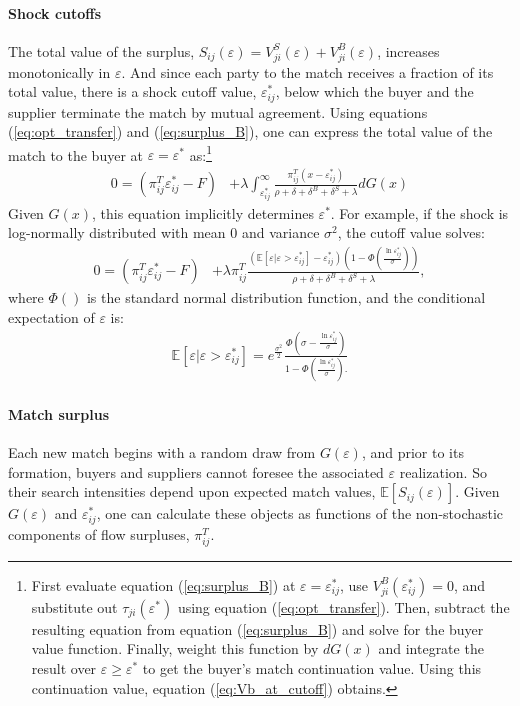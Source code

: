 \documentclass[12pt]{article} \usepackage{amsmath,amssymb,amsthm,geometry,graphicx,setspace,algorithm,algpseudocode,float}
\newcommand{\subsubsubsection}[1]{\paragraph{#1}}
\begin{document}
\subsubsubsection{Shock cutoffs}
The total value of the surplus,  $S_{ij}(\varepsilon) =   V_{ji}^S(\varepsilon) + V_{ji}^B(\varepsilon)$, increases monotonically in $\varepsilon$. And since each party to the match receives a fraction of its total value, there is a shock cutoff value, $\varepsilon_{ij}^\ast$, below which the buyer and the supplier terminate the match by mutual agreement. Using equations (\ref{eq:opt_transfer}) and (\ref{eq:surplus_B}), one can express the total value of the match to the buyer at $\varepsilon = \varepsilon^{\ast}$ as:\footnote{First evaluate equation (\ref{eq:surplus_B}) at $\varepsilon = \varepsilon_{ij}^\ast$, use $V_{ji}^B(\varepsilon_{ij}^\ast)=0$, and substitute out $\tau_{ji}(\varepsilon^{\ast})$ using equation (\ref{eq:opt_transfer}). Then, subtract the resulting equation from equation (\ref{eq:surplus_B}) and solve for the buyer value function. Finally, weight this function by $dG(x)$ and integrate the result over $\varepsilon \geq \varepsilon^{\ast}$ to get the buyer's match continuation value. Using this continuation value, equation (\ref{eq:Vb_at_cutoff}) obtains.}
\begin{align}
    0 = (\pi_{ij}^T\varepsilon_{ij}^\ast -F) & +  \lambda \int_{\varepsilon_{ij}^\ast}^{\infty} \frac{\pi_{ij}^T(x - \varepsilon_{ij}^\ast) }{\rho + \delta + \delta^B + \delta^S + \lambda} dG(x) 
    \label{eq:Vb_at_cutoff}
\end{align}
Given $G(x)$, this equation implicitly determines $\varepsilon^{\ast}$. For example, if the shock is log-normally distributed with mean $0$ and variance $\sigma^2$, the cutoff value solves:
\begin{align} 
0  = (\pi_{ij}^T\varepsilon_{ij}^\ast -F) & + \lambda \pi_{ij}^T \frac{ \left(\mathbb{E}[\varepsilon | \varepsilon > \varepsilon_{ij}^\ast]  -  \varepsilon_{ij}^\ast \right) \left(1-\Phi\left(\frac{\ln \varepsilon_{ij}^\ast}{\sigma} \right)\right)}{\rho + \delta + \delta^B + \delta^S + \lambda},
\end{align}
where $\Phi()$ is the standard normal distribution function, and the conditional expectation of $\varepsilon$ is:
\begin{align} 
    \mathbb{E}[\varepsilon | \varepsilon > \varepsilon_{ij}^\ast] = e^{\frac{\sigma^2}{2}} \frac{\Phi\left(\sigma - \frac{\ln \varepsilon_{ij}^\ast}{\sigma}\right)}{1-\Phi\left(\frac{\ln \varepsilon_{ij}^\ast}{\sigma}\right).}
\end{align}

\subsubsubsection{Match surplus}
\label{sec:match_surplus_MP}
Each new match begins with a random draw from $G(\varepsilon)$, and prior to its formation, buyers and suppliers cannot foresee the associated $\varepsilon$ realization. So their search intensities depend upon expected match values, $\mathbb{E}\left[S_{ij}(\varepsilon)\right]$. Given $G(\varepsilon)$ and $\varepsilon_{ij}^{\ast}$, one can calculate these objects as functions of the non-stochastic components of flow surpluses, $\pi_{ij}^T$. 
\end{document}
